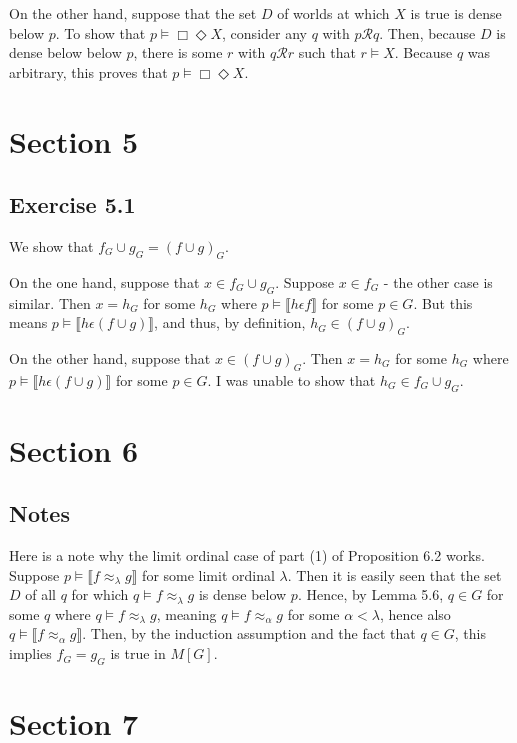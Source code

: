 \documentclass{article}
\newcommand{\lbc}{\llbracket}
\newcommand{\rbc}{\rrbracket}
\theoremstyle{definition}
\begin{document}
On the other hand, suppose that the set $D$ of worlds at which $X$ is true is dense below $p$. 
To show that $p\vDash\Box\Diamond X$, consider any $q$ with $p\mathcal{R}q$. Then, because 
$D$ is dense below below $p$, there is some $r$ with $q\mathcal{R}r$ such that 
$r\vDash X$. Because $q$ was arbitrary, this proves that $p\vDash\Box\Diamond X$. 

\section*{Section 5}

\subsection*{Exercise 5.1}
We show that $f_G\cup g_G=(f\cup g)_G$.

On the one hand, suppose that $x\in f_G\cup g_G$. Suppose $x\in f_G$ - the other case is similar.
Then $x=h_G$ for some $h_G$ where $p\vDash\lbc h\epsilon f\rbc$ for some $p\in G$. But this means 
$p\vDash\lbc h\epsilon (f\cup g)\rbc$, and thus, by definition, $h_G\in (f\cup g)_G$.

On the other hand, suppose that $x\in (f\cup g)_G$. Then 
$x=h_G$ for some $h_G$ where $p\vDash\lbc h\epsilon (f\cup g)\rbc$ for some $p\in G$. I was unable to show that
$h_G\in f_G\cup g_G$. 

\section*{Section 6}

\subsection*{Notes}
Here is a note why the limit ordinal case of part (1) of Proposition 6.2 works. Suppose 
$p\vDash\lbc f\approx_\lambda g\rbc$ for some limit ordinal $\lambda$. Then it is easily seen 
that the set $D$ of all $q$ for which $q\vDash f\approx_\lambda g$ is dense below $p$. Hence, by 
Lemma 5.6, $q\in G$ for some $q$ where $q\vDash f\approx_\lambda g$, meaning 
$q\vDash f\approx_\alpha g$ for some $\alpha<\lambda$, hence also $q\vDash\lbc f\approx_\alpha g\rbc$. Then, by 
the induction assumption and the fact that $q\in G$, this implies $f_G=g_G$ is true in $M[G]$. 

\section*{Section 7}
\end{document}

